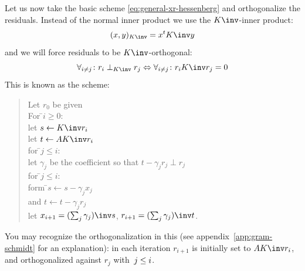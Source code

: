 Let us now take the basic scheme \eqref{eq:general-xr-hessenberg} and
orthogonalize the residuals. Instead of the normal inner product we
use the $K\inv$-inner product:
\[ (x,y)_{K\inv} = x^tK\inv y \]
and we will force residuals to be $K\inv$-orthogonal:
\[ \forall_{i\not=j}\colon r_i\perp_{K\inv} r_j \Leftrightarrow
   \forall_{i\not=j}\colon r_iK\inv r_j=0
\]
This is known as the 
scheme:
\begin{quote}
  \begin{tabbing}
    Let $r_0$ be given\\
    For \=$i\geq 0$:\\
    \>let $s\leftarrow K\inv r_i$\\
    \>let $t\leftarrow AK\inv r_i$\\
    \>for \=$j\leq i$:\\
    \>\>let $\gamma_j$ be the coefficient so that $t-\gamma_jr_j\perp r_j$\\
    \>for \=$j\leq i$:\\
    \>\>form \=$s\leftarrow s-\gamma_jx_j$\\
    \>\>and  \>$t\leftarrow t-\gamma_jr_j$\\
    \>let $x_{i+1}=(\sum_j\gamma_j)\inv s$,
    $r_{i+1}=(\sum_j\gamma_j)\inv t$.\\
  \end{tabbing}
\end{quote}
You may recognize the  orthogonalization in
this (see appendix~\ref{app:gram-schmidt} for an explanation): in each
iteration $r_{i+1}$ is initially set to $AK\inv r_i$, and orthogonalized
against $r_j$ with~$j\leq\nobreak i$.

